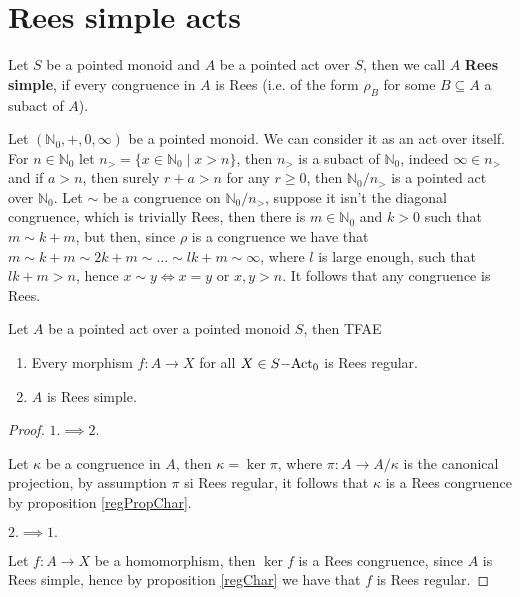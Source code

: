 \section{Rees simple acts}
\begin{definition}
    Let $S$ be a pointed monoid and $A$ be a pointed act over $S$, then we call $A$
    \textbf{Rees simple}, if every congruence in $A$ is Rees (i.e. of the form $\rho_B$ for some $B\subseteq A$ a subact of $A$).
\end{definition}
\begin{example}
    Let $(\mathbb{N}_0, +, 0, \infty)$ be a pointed monoid. We can consider it as an act over itself. For $n\in\mathbb{N}_0$ let 
    $n_> = \{x\in\mathbb{N}_0 \mid x > n\}$, then $n_>$ is a subact of $\mathbb{N}_0$, indeed $\infty\in n_>$ and if $a > n$, then 
    surely $r+a > n$ for any $r \geq 0$, then $\mathbb{N}_0/n_>$ is a pointed act over $\mathbb{N}_0$. Let $\sim$ be a congruence on 
    $\mathbb{N}_0/n_>$, suppose it isn't the diagonal congruence, which is trivially Rees, then there is $m\in\mathbb{N}_0$ and $k>0$ such that 
    $m\sim k+m$, but then, since $\rho$ is a congruence we have that $m\sim k+m\sim 2k+m \sim\dots \sim lk+m \sim \infty$, where $l$
    is large enough, such that $lk+m > n$, hence $x\sim y \iff x=y$ or $x,y > n$. It follows that any congruence is Rees. 
\end{example}
\begin{proposition}
    Let $A$ be a pointed act over a pointed monoid $S$, then TFAE
    \begin{enumerate}
        \item Every morphism $f: A \to X$ for all $X\in S\mathrm{-Act}_0$ is Rees regular.
        \item $A$ is Rees simple.
    \end{enumerate}
\end{proposition}
\begin{proof}[Proof]
    $1. \implies 2.$\par 
    Let $\kappa$ be a congruence in $A$, then $\kappa=\ker{\pi}$, where $\pi: A \to A/\kappa$ is the canonical projection, by 
    assumption $\pi$ si Rees regular, it follows that $\kappa$ is a Rees congruence by proposition \ref{regPropChar}. \par 
    $2. \implies 1.$\par 
    Let $f: A\to X$ be a homomorphism, then $\ker{f}$ is a Rees congruence, since $A$ is Rees simple, hence by proposition \ref{regChar} 
    we have that $f$ is Rees regular.
\end{proof}
